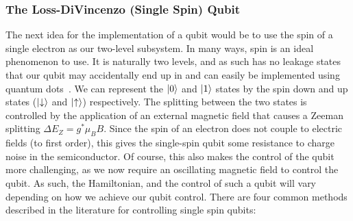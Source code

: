 \subsubsection{The Loss-DiVincenzo (Single Spin) Qubit}
The next idea for the implementation of a qubit would be to use the spin of a single electron as our two-level subsystem. In
many ways, spin is an ideal phenomenon to use. It is naturally two levels, and as such has no leakage states that our qubit
may accidentally end up in and can easily be implemented using quantum dots~\cite{PhysRevA.57.120}. We can represent the $\ket{0}$ and $\ket{1}$ states
by the spin down and up states ($\ket{\downarrow}$ and $\ket{\uparrow}$) respectively. The splitting between the two states
is controlled by the application of an external magnetic field that causes a Zeeman splitting $\Delta E_Z = g^* \mu_B B$. Since the
spin of an electron does not couple to electric fields (to first order), this gives the single-spin qubit some resistance to
charge noise in the semiconductor. Of course, this also makes the control of the qubit more challenging, as we now require
an oscillating magnetic field to control the qubit. As such, the Hamiltonian, and the control of such a qubit will vary depending on
how we achieve our qubit control. There are four common methods described in the literature for controlling
single spin qubits:

